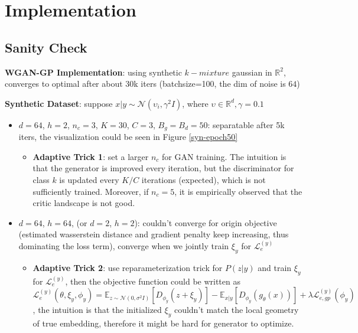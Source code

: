 \documentclass{article}
\begin{document}
\section{Implementation}

\subsection{Sanity Check}

\noindent \textbf{WGAN-GP Implementation}: using synthetic $k-mixture$ gaussian in $\mathbb{R}^2$, converges to optimal after about 30k iters (batchsize=100, the dim of noise is $64$)

\noindent \textbf{Synthetic Dataset}: suppose $x|y \sim \mathcal{N}(\upsilon_i, \gamma^2 I)$, where $\upsilon \in \mathbb{R}^d, \gamma = 0.1$

\begin{itemize}
    \item $d=64$, $h=2$, $n_c=3$, $K=30$, $C=3$, $B_g=B_d=50$: separatable after 5k iters, the visualization could be seen in Figure \ref{syn-epoch50}
    \begin{itemize}
        \item \textbf{Adaptive Trick 1}: set a larger $n_c$ for GAN training. The intuition is that the generator is improved every iteration, but the discriminator for class $k$ is updated every $K/C$ iterations (expected), which is not sufficiently trained. Moreover, if $n_c=5$, it is empirically observed that the critic landscape is not good.
    \end{itemize}
    \item $d=64$, $h=64$, (or $d=2$, $h=2$): couldn't converge for origin objective (estimated wasserstein distance and gradient penalty keep increasing, thus dominating the loss term), converge when we jointly train $\xi_y$ for $\mathcal{L}_e^{(y)}$
    \begin{itemize}
        \item \textbf{Adaptive Trick 2}: use reparameterization trick for $P(z|y)$ and train $\xi_y$ for $\mathcal{L}_e^{(y)}$, then the objective function could be written as
        $$ \mathcal{L}_{e}^{(y)}(\theta, \xi_y, \phi_y) = \mathbb{E}_{z\sim\mathcal{N}(0, \sigma^2I)}[D_{\phi_y}(z + \xi_y)]-\mathbb{E}_{x|y}[D_{\phi_y}(g_\theta(x))] + \lambda \mathcal{L}_{e, gp}^{(y)}(\phi_y)$$, the intuition is that the initialized $\xi_y$ couldn't match the local geometry of true embedding, therefore it might be hard for generator to optimize.
    \end{itemize}
\end{itemize}
\end{document}
